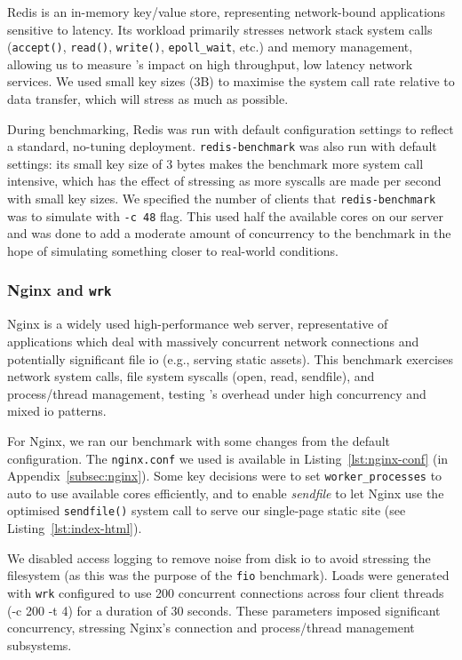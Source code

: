 Redis is an in-memory key/value store, representing network-bound applications 
sensitive to latency. Its workload primarily stresses network stack system calls 
(\texttt{accept()}, \texttt{read()}, \texttt{write()}, \texttt{epoll\_wait}, 
etc.) and memory management, allowing us to  measure  \af's impact on high 
throughput, low latency network services. We used small key sizes (3B) to 
maximise the system call rate relative to data transfer, which will stress \af as 
much as possible.

During benchmarking, Redis was run with default configuration settings to
reflect a standard, no-tuning deployment. \texttt{redis-benchmark} was also run
with default settings: its small key size of 3 bytes makes the benchmark more
system call intensive, which has the effect of stressing \af as more syscalls are
made per second with small key sizes. We specified the number of clients that
\texttt{redis-benchmark} was to simulate with \texttt{-c 48} flag. This used
half the available cores on our server and was done to add a moderate amount of
concurrency to the benchmark in the hope of simulating something closer to
real-world conditions.

\subsubsection{Nginx and \texttt{wrk}}\label{subsubsec:nginx-just}

Nginx is a widely used high-performance web server, representative of applications
which deal with massively concurrent network connections and potentially
significant file \ac{io} (e.g., serving static assets). This benchmark exercises
network system calls, file system syscalls (open, read, sendfile),
and process/thread management, testing \af's overhead under high concurrency
and mixed \ac{io} patterns.

For Nginx, we ran our benchmark with some changes from the
default configuration. The \texttt{nginx.conf} we used is available in
Listing~\ref{lst:nginx-conf} (in Appendix~\ref{subsec:nginx}). Some key 
decisions were to set \texttt{worker\_processes} to auto to use available cores 
efficiently, and to enable \textit{sendfile} to let Nginx use the optimised 
\texttt{sendfile()} system call to serve our single-page static site (see 
Listing~\ref{lst:index-html}).

We disabled access logging to remove noise from disk \ac{io} to avoid stressing
the filesystem (as this was the purpose of the \texttt{fio} benchmark).
Loads were generated with \texttt{wrk} configured to use 200 concurrent
connections across four client threads (-c 200 -t 4) for a duration of 30
seconds. These parameters imposed significant concurrency, stressing Nginx's
connection and process/thread management subsystems.

